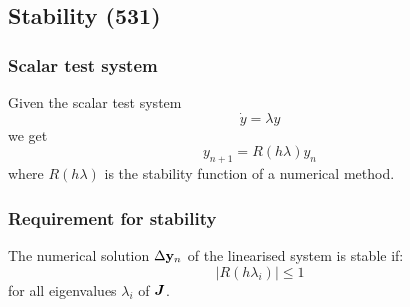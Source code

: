 \documentclass[a4paper, 12pt]{article}
\begin{document}
\subsection{Stability (531)}
\subsubsection{Scalar test system}
Given the scalar test system
\begin{equation}
	\dot{y} = \lambda y
\end{equation}
we get
\begin{equation}
	y_{n+1} = R(h \lambda) y_n
\end{equation}
where \( R(h \lambda )\) is the stability function of a numerical method.
\subsubsection{Requirement for stability}
The numerical solution \( \Delta \mathbf{y}_n \) of the linearised system is stable if:
\begin{equation}
	| R(h\lambda_i) | \leq 1
\end{equation}
for all eigenvalues \( \lambda_i \) of \( \bm{J} \).
\end{document}
